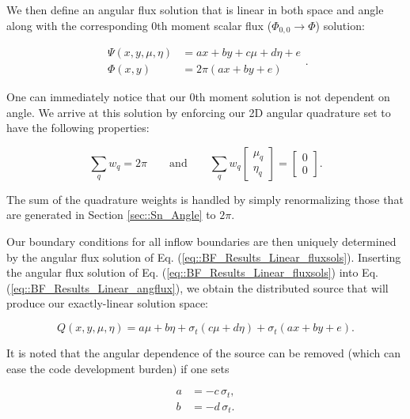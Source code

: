 We then define an angular flux solution that is linear in both space and angle along with the corresponding 0th moment scalar flux ($\Phi_{0,0} \rightarrow \Phi$) solution:

\begin{equation}
\label{eq::BF_Results_Linear_fluxsols}
\begin{aligned}
\Psi (x,y,\mu,\eta) &= ax + by + c \mu + d\eta + e\\
\Phi (x,y) &= 2 \pi \left( ax + by  + e \right)
\end{aligned} .
\end{equation}

\noindent One can immediately notice that our 0th moment solution is not dependent on angle. We arrive at this solution by enforcing our 2D angular quadrature set to have the following properties:

\begin{equation}
\label{eq::BF_Results_Linear_quadrules}
\sum_{q} w_q = 2 \pi \qquad \text{and} \qquad \sum_{q} w_q  \left[
	\begin{array}{c}
		\mu_q \\
		\eta_q
	\end{array} \right] = \left[
	\begin{array}{c}
		0 \\
		0
	\end{array} \right] .
\end{equation}

\noindent The sum of the quadrature weights is handled by simply renormalizing those that are generated in Section \ref{sec::Sn_Angle} to $2 \pi$.

Our boundary conditions for all inflow boundaries are then uniquely determined by the angular flux solution of Eq. (\ref{eq::BF_Results_Linear_fluxsols}). Inserting the angular flux solution of Eq. (\ref{eq::BF_Results_Linear_fluxsols}) into Eq. (\ref{eq::BF_Results_Linear_angflux}), we obtain the distributed source that will produce our exactly-linear solution space:

\begin{equation}
\label{eq::BF_Results_Linear_src}
Q(x,y,\mu,\eta) = a \mu + b \eta + \sigma_t \left(  c \mu + d \eta \right) + \sigma_t \left( ax +by + e   \right).
\end{equation}

\noindent It is noted that the angular dependence of the source can be removed (which can ease the code development burden) if one sets

\begin{equation}
\label{eq::BF_Results_Linear_removeterms}
\begin{aligned}
	a &= - c \, \sigma_t, \\
	b &= - d \, \sigma_t.
\end{aligned}
\end{equation}

